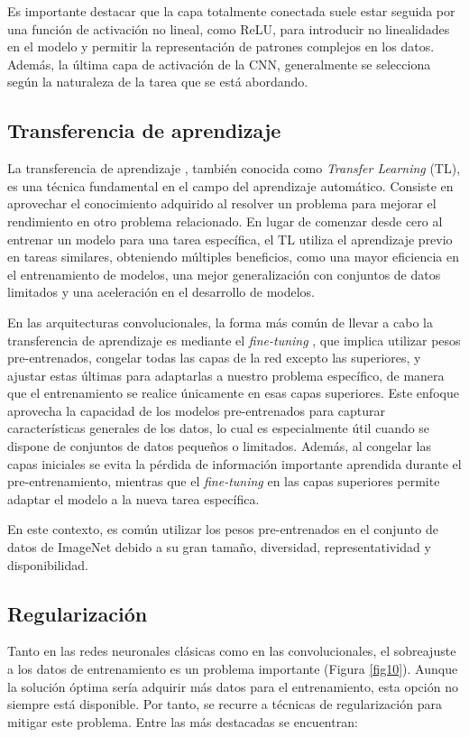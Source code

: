 Es importante destacar que la capa totalmente conectada suele estar seguida por una función de activación no lineal, como ReLU, para introducir no linealidades en el modelo y permitir la representación de patrones complejos en los datos. Además, la última capa de activación de la CNN, generalmente se selecciona según la naturaleza de la tarea que se está abordando.

\subsection{Transferencia de aprendizaje}

La transferencia de aprendizaje \cite{49}, también conocida como \textit{Transfer Learning} (TL), es una técnica fundamental en el campo del aprendizaje automático. Consiste en aprovechar el conocimiento adquirido al resolver un problema para mejorar el rendimiento en otro problema relacionado. En lugar de comenzar desde cero al entrenar un modelo para una tarea específica, el TL utiliza el aprendizaje previo en tareas similares, obteniendo múltiples beneficios, como una mayor eficiencia en el entrenamiento de modelos, una mejor generalización con conjuntos de datos limitados y una aceleración en el desarrollo de modelos.

En las arquitecturas convolucionales, la forma más común de llevar a cabo la transferencia de aprendizaje es mediante el \textit{fine-tuning} \cite{39}, que implica utilizar pesos pre-entrenados, congelar todas las capas de la red excepto las superiores, y ajustar estas últimas para adaptarlas a nuestro problema específico, de manera que el entrenamiento se realice únicamente en esas capas superiores. Este enfoque aprovecha la capacidad de los modelos pre-entrenados para capturar características generales de los datos, lo cual es especialmente útil cuando se dispone de conjuntos de datos pequeños o limitados. Además, al congelar las capas iniciales se evita la pérdida de información importante aprendida durante el pre-entrenamiento, mientras que el \textit{fine-tuning} en las capas superiores permite adaptar el modelo a la nueva tarea específica.

En este contexto, es común utilizar los pesos pre-entrenados en el conjunto de datos de ImageNet \cite{50} debido a su gran tamaño, diversidad, representatividad y disponibilidad.


\subsection{Regularización}\label{regularizacion}
Tanto en las redes neuronales clásicas como en las convolucionales, el sobreajuste a los datos de entrenamiento es un problema importante (Figura \ref{fig10}). Aunque la solución óptima sería adquirir más datos para el entrenamiento, esta opción no siempre está disponible. Por tanto, se recurre a técnicas de regularización para mitigar este problema. Entre las más destacadas se encuentran:

